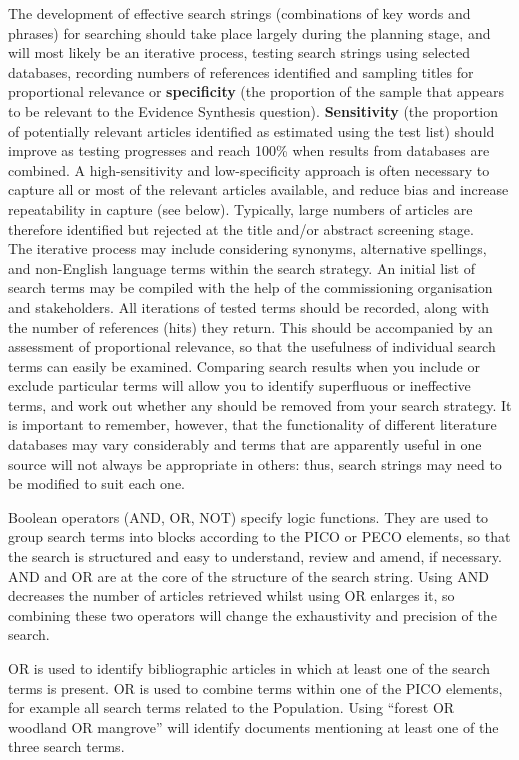 \documentclass[
  letterpaper,
  DIV=11,
  numbers=noendperiod]{scrreprt}
\begin{document}
The development of effective search strings (combinations of key words
and phrases) for searching should take place largely during the planning
stage, and will most likely be an iterative process, testing search
strings using selected databases, recording numbers of references
identified and sampling titles for proportional relevance or
\textbf{specificity} (the proportion of the sample that appears to be
relevant to the Evidence Synthesis question). \textbf{Sensitivity} (the
proportion of potentially relevant articles identified as estimated
using the test list) should improve as testing progresses and reach
100\% when results from databases are combined. A high-sensitivity and
low-specificity approach is often necessary to capture all or most of
the relevant articles available, and reduce bias and increase
repeatability in capture (see below). Typically, large numbers of
articles are therefore identified but rejected at the title and/or
abstract screening stage.\\
The iterative process may include considering synonyms, alternative
spellings, and non-English language terms within the search strategy. An
initial list of search terms may be compiled with the help of the
commissioning organisation and stakeholders. All iterations of tested
terms should be recorded, along with the number of references (hits)
they return. This should be accompanied by an assessment of proportional
relevance, so that the usefulness of individual search terms can easily
be examined. Comparing search results when you include or exclude
particular terms will allow you to identify superfluous or ineffective
terms, and work out whether any should be removed from your search
strategy. It is important to remember, however, that the functionality
of different literature databases may vary considerably and terms that
are apparently useful in one source will not always be appropriate in
others: thus, search strings may need to be modified to suit each one.

Boolean operators (AND, OR, NOT) specify logic functions. They are used
to group search terms into blocks according to the PICO or PECO
elements, so that the search is structured and easy to understand,
review and amend, if necessary. AND and OR are at the core of the
structure of the search string. Using AND decreases the number of
articles retrieved whilst using OR enlarges it, so combining these two
operators will change the exhaustivity and precision of the search.

OR is used to identify bibliographic articles in which at least one of
the search terms is present. OR is used to combine terms within one of
the PICO elements, for example all search terms related to the
Population. Using ``forest OR woodland OR mangrove'' will identify
documents mentioning at least one of the three search terms.
\end{document}
